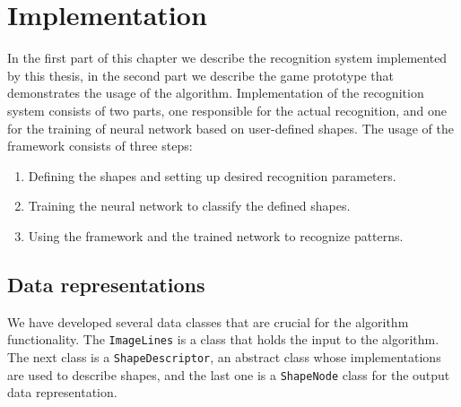 \chapter{Implementation}
\label{ch:impl}
In the first part of this chapter we describe the recognition system implemented by this thesis, in the second part we describe the game prototype that demonstrates the usage of the algorithm. Implementation of the recognition system consists of two parts, one responsible for the actual recognition, and one for the training of neural network based on user-defined shapes. The usage of the framework consists of three steps:
\begin{enumerate}
\item Defining the shapes and setting up desired recognition parameters.
\item Training the neural network to classify the defined shapes.
\item Using the framework and the trained network to recognize patterns.
\end{enumerate}

\section{Data representations}
We have developed several data classes that are crucial for the algorithm functionality. The \texttt{ImageLines} is a class that holds the input to the algorithm. The next class is a \texttt{ShapeDescriptor}, an abstract class whose implementations are used to describe shapes, and the last one is a \texttt{ShapeNode} class for the output data representation.

